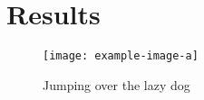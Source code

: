 \chapter{Results}
\lipsum[26-30]
\begin{figure}
  \centering
  \texttt{[image: example-image-a]}
  \caption{Jumping over the lazy dog}
\end{figure}